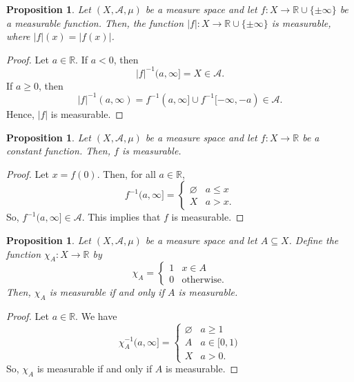 \documentclass[a4paper, openany]{memoir}
\theoremstyle{definition}
\theoremstyle{plain}
\newtheorem{proposition}[definition]{Proposition}
\begin{document}
    \begin{proposition}
        Let $(X, \mathcal{A}, \mu)$ be a measure space and let $f \colon X \to \mathbb{R} \cup \{\pm \infty\}$ be a measurable function. Then, the function $|f| \colon X \to \mathbb{R} \cup \{\pm \infty\}$ is measurable, where $|f|(x) = |f(x)|$.
    \end{proposition}
    \begin{proof}
        Let $a \in \mathbb{R}$. If $a < 0$, then
        \[|f|^{-1}(a, \infty] = X \in \mathcal{A}.\]
        If $a \geq 0$, then
        \[|f|^{-1}(a, \infty) = f^{-1}(a, \infty] \cup f^{-1}[-\infty, -a) \in \mathcal{A}.\]
        Hence, $|f|$ is measurable.
    \end{proof}

    \begin{proposition}
        Let $(X, \mathcal{A}, \mu)$ be a measure space and let $f \colon X \to \mathbb{R}$ be a constant function. Then, $f$ is measurable.
    \end{proposition}
    \begin{proof}
        Let $x = f(0)$. Then, for all $a \in \mathbb{R}$,
        \[f^{-1}(a, \infty] = \begin{cases}
            \varnothing & a \leq x \\
            X & a > x.
        \end{cases}\]
        So, $f^{-1}(a, \infty] \in \mathcal{A}$. This implies that $f$ is measurable.
    \end{proof}

    \begin{proposition}
        Let $(X, \mathcal{A}, \mu)$ be a measure space and let $A \subseteq X$. Define the function $\chi_A \colon X \to \mathbb{R}$ by
        \[\chi_A = \begin{cases}
            1 & x \in A \\
            0 & \textrm{otherwise}.
        \end{cases}\]
        Then, $\chi_A$ is measurable if and only if $A$ is measurable.
    \end{proposition}
    \begin{proof}
        Let $a \in \mathbb{R}$. We have
        \[\chi_A^{-1}(a, \infty] = \begin{cases}
            \varnothing & a \geq 1 \\
            A & a \in [0, 1) \\
            X & a > 0.
        \end{cases}\]
        So, $\chi_A$ is measurable if and only if $A$ is measurable.
    \end{proof}
\end{document}
